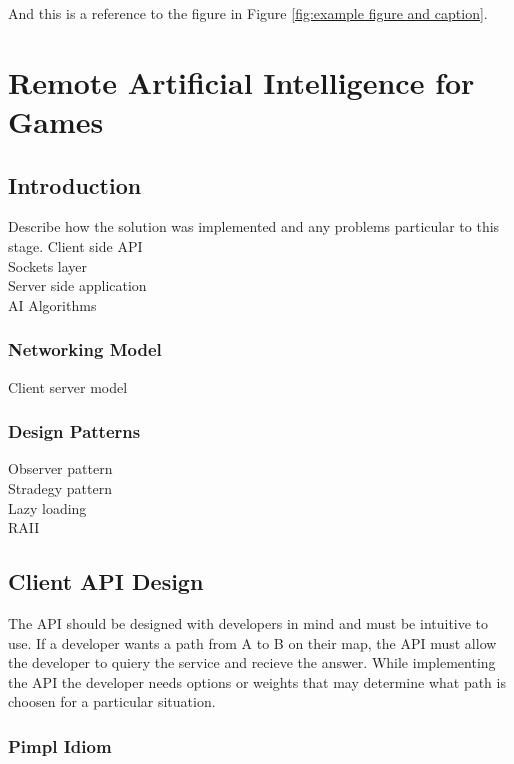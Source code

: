 \documentclass[12pt,a4paper,titlepage]{article}
\begin{document}
And this is a reference to the figure in Figure \ref{fig:example figure and caption}.

\section{Remote Artificial Intelligence for Games}

\subsection{Introduction}

Describe how the solution was implemented and any problems particular to this stage.
Client side API\\
Sockets layer\\
Server side application\\
AI Algorithms\\

\subsubsection{Networking Model}

Client server model\\

\subsubsection{Design Patterns}
Observer pattern\\
Stradegy pattern\\
Lazy loading\\
RAII\\

\subsection{Client API Design}
\label{section:clientapidesign}

The API should be designed with developers in mind and must be intuitive to use. If a developer wants a path from A to B on their map, the API must allow the developer to quiery the service and recieve the answer. While implementing the API the developer needs options or weights that may determine what path is choosen for a particular situation. 

\subsubsection{Pimpl Idiom}
\end{document}
